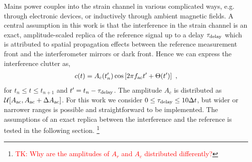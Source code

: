 \documentclass[pra,superscriptaddress,reprint,amsmath,amssymb,nofootinbib]{revtex4-2}
\begin{document}
Mains power couples into the strain channel in various complicated ways, e.g. through electronic devices, or inductively through ambient magnetic fields. A central assumption in this work is that the interference in the strain channel is an exact, amplitude-scaled replica of the reference signal up to a delay $\tau_{\rm delay}$ which is attributed to spatial propagation effects between the reference measurement front and the interferometer mirrors or dark front. Hence we can express the interference clutter as, 
 \begin{eqnarray}
	c(t) = A_c(t'_n) \cos \left[ 2 \pi f_{\rm ac} t' + \Theta(t')\right] \ ,
	\label{eq:vclutter}
\end{eqnarray}
for $t_n \leq t \leq t_{n+1}$ and $t' = t_n - \tau_{\rm delay}$. The amplitude $A_c$ is distributed as $\mathcal{U}[A_{\rm ac} ,A_{\rm ac} + \Delta A_{\rm ac} ]$. For this work we consider $0 \leq \tau_{\rm delay} \leq 10 \Delta t$, but wider or narrower ranges is possible and straightforward to be implemented. The assumptions of an exact replica between the interference and the reference is tested in the following section. \footnote{\tiny \textcolor{red}{TK: Why are the amplitudes of $A_r$ and $A_c$ distributed differently?}\normalsize}
\end{document}
